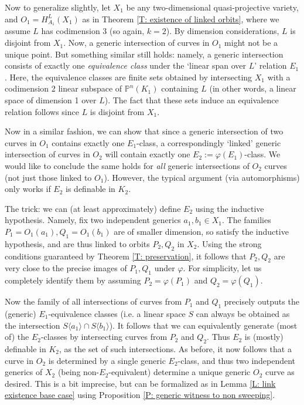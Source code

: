 \documentclass{amsart}
\theoremstyle{definition}
\begin{document}
Now to generalize slightly, let $X_1$ be any two-dimensional quasi-projective variety, and $O_1=H_{A_1}^L(X_1)$ as in Theorem \ref{T: existence of linked orbits}, where we assume $L$ has codimension 3 (so again, $k=2$). By dimension considerations, $L$ is disjoint from $X_1$. Now, a generic intersection of curves in $O_1$ might not be a unique point. But something similar still holds: namely, a generic intersection consists of exactly one \textit{equivalence class} under the `linear span over $L$' relation $E_1$. Here, the equivalence classes are finite sets obtained by intersecting $X_1$ with a codimension 2 linear subspace of $\mathbb P^n(K_1)$ containing $L$ (in other words, a linear space of dimension 1 over $L$). The fact that these sets induce an equivalence relation follows since $L$ is disjoint from $X_1$.

Now in a similar fashion, we can show that since a generic intersection of two curves in $O_1$ contains exactly one $E_1$-class, a correspondingly `linked' generic intersection of curves in $O_2$ will contain exactly one $E_2:=\varphi(E_1)$-class. We would like to conclude the same holds for \textit{all} generic intersections of $O_2$ curves (not just those linked to $O_1$). However, the typical argument (via automorphisms) only works if $E_2$ is definable in $K_2$.

The trick: we can (at least approximately) define $E_2$ using the inductive hypothesis. Namely, fix two independent generics $a_1,b_1\in X_1$. The families $P_1=O_1(a_1),Q_1=O_1(b_1)$ are of smaller dimension, so satisfy the inductive hypothesis, and are thus linked to orbits $P_2,Q_2$ in $X_2$. Using the strong conditions guaranteed by Theorem \ref{T: preservation}, it follows that $P_2,Q_2$ are very close to the precise images of $P_1,Q_1$ under $\varphi$. For simplicity, let us completely identify them by assuming $P_2=\varphi(P_1)$ and $Q_2=\varphi(Q_1)$.

Now the family of all intersections of curves from $P_1$ and $Q_1$ precisely outputs the (generic) $E_1$-equivalence classes (i.e. a linear space $S$ can always be obtained as the intersection $S\langle a_1\rangle\cap S\langle b_1\rangle$). It follows that we can equivalently generate (most of) the $E_2$-classes by intersecting curves from $P_2$ and $Q_2$. Thus $E_2$ is (mostly) definable in $K_2$, as the set of such intersections. As before, it now follows that a curve in $O_2$ is determined by a single generic $E_2$-class, and thus two independent generics of $X_2$ (being non-$E_2$-equivalent) determine a unique generic $O_2$ curve as desired. This is a bit imprecise, but can be formalized as in Lemma \ref{L: link existence base case} using Proposition \ref{P: generic witness to non sweeping}.  
\end{document}
